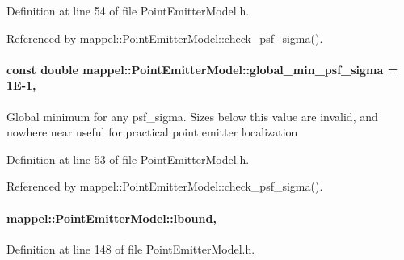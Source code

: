 Definition at line 54 of file Point\+Emitter\+Model.\+h.



Referenced by mappel\+::\+Point\+Emitter\+Model\+::check\+\_\+psf\+\_\+sigma().

\paragraph[{\texorpdfstring{global\+\_\+min\+\_\+psf\+\_\+sigma}{global_min_psf_sigma}}]{\setlength{\rightskip}{0pt plus 5cm}const double mappel\+::\+Point\+Emitter\+Model\+::global\+\_\+min\+\_\+psf\+\_\+sigma = 1\+E-\/1\hspace{0.3cm}{\ttfamily [static]}, {\ttfamily [inherited]}}\hypertarget{classmappel_1_1PointEmitterModel_a77d0ca98d77cb8b94117ece2a5b182a4}{}\label{classmappel_1_1PointEmitterModel_a77d0ca98d77cb8b94117ece2a5b182a4}
Global minimum for any psf\+\_\+sigma. Sizes below this value are invalid, and nowhere near useful for practical point emitter localization 

Definition at line 53 of file Point\+Emitter\+Model.\+h.



Referenced by mappel\+::\+Point\+Emitter\+Model\+::check\+\_\+psf\+\_\+sigma().

\paragraph[{\texorpdfstring{lbound}{lbound}}]{ mappel\+::\+Point\+Emitter\+Model\+::lbound\hspace{0.3cm}{\ttfamily [protected]}, {\ttfamily [inherited]}}\hypertarget{classmappel_1_1PointEmitterModel_a889bc82f74cfa654da121e5770296ab2}{}\label{classmappel_1_1PointEmitterModel_a889bc82f74cfa654da121e5770296ab2}


Definition at line 148 of file Point\+Emitter\+Model.\+h.



